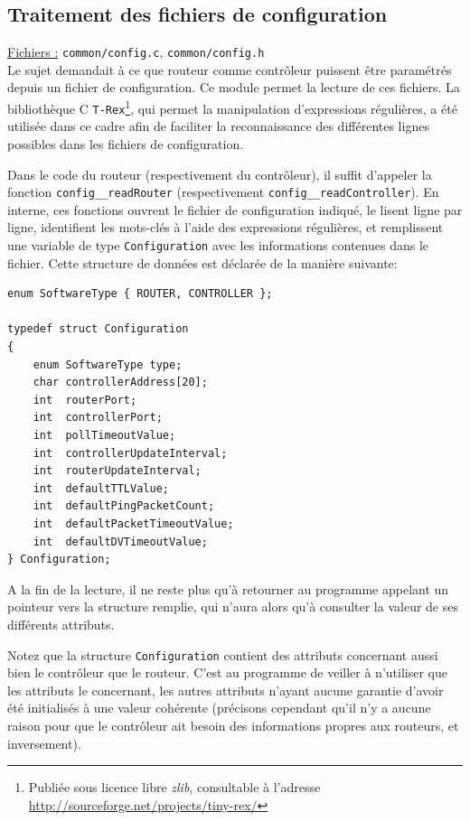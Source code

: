 \documentclass[a4paper,11pt]{article}
\begin{document}
\subsection{Traitement des fichiers de configuration}

\underline{Fichiers :} \texttt{common/config.c}, \texttt{common/config.h}\\

Le sujet demandait à ce que routeur comme contrôleur puissent être paramétrés depuis un fichier de configuration. Ce module permet la lecture de ces fichiers. La bibliothèque C \texttt{T-Rex}\footnote{Publiée sous licence libre \textit{zlib}, consultable à l'adresse \url{http://sourceforge.net/projects/tiny-rex/}}, qui permet la manipulation d'expressions régulières, a été utilisée dans ce cadre afin de faciliter la reconnaissance des différentes lignes possibles dans les fichiers de configuration.

Dans le code du routeur (respectivement du contrôleur), il suffit d'appeler la fonction \texttt{config\_\_readRouter} (respectivement \texttt{config\_\_readController}). En interne, ces fonctions ouvrent le fichier de configuration indiqué, le lisent ligne par ligne, identifient les mots-clés à l'aide des expressions régulières, et remplissent une variable de type \texttt{Configuration} avec les informations contenues dans le fichier. Cette structure de données est déclarée de la manière suivante:

\begin{lstlisting}
enum SoftwareType { ROUTER, CONTROLLER };

typedef struct Configuration
{
	enum SoftwareType type;
	char controllerAddress[20];
	int  routerPort;
	int  controllerPort;
	int  pollTimeoutValue;
	int  controllerUpdateInterval;
	int  routerUpdateInterval;
	int  defaultTTLValue;
	int  defaultPingPacketCount;
	int  defaultPacketTimeoutValue;
	int  defaultDVTimeoutValue;
} Configuration;
\end{lstlisting}

A la fin de la lecture, il ne reste plus qu'à retourner au programme appelant un pointeur vers la structure remplie, qui n'aura alors qu'à consulter la valeur de ses différents attributs.

Notez que la structure \texttt{Configuration} contient des attributs concernant aussi bien le contrôleur que le routeur. C'est au programme de veiller à n'utiliser que les attributs le concernant, les autres attributs n'ayant aucune garantie d'avoir été initialisés à une valeur cohérente (précisons cependant qu'il n'y a aucune raison pour que le contrôleur ait besoin des informations propres aux routeurs, et inversement).
\end{document}
